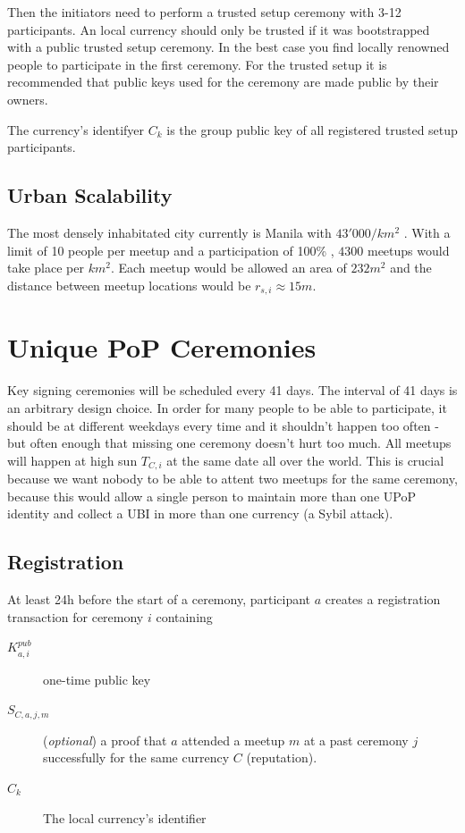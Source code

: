 \documentclass[conference]{IEEEtran}
\begin{document}
Then the initiators need to perform a trusted setup ceremony with 3-12 participants. An \encointer local currency should only be trusted if it was bootstrapped with a public trusted setup ceremony. In the best case you find locally renowned people to participate in the first ceremony. For the trusted setup it is recommended that public keys used for the ceremony are made public by their owners.

The currency's identifyer $C_k$ is the group public key of all registered trusted setup participants.

\subsection{Urban Scalability}
The most densely inhabitated city currently is Manila with $43'000/km^2$ \cite{manila18}. With a limit of 10 people per meetup and a participation of 100\% , $4300$ meetups would take place per $km^2$. Each meetup would be allowed an area of $232 m^2$ and the distance between meetup locations would be $r_{s,i} \approx 15m$. 

\section{Unique PoP Ceremonies}\label{sec:upop}
Key signing ceremonies will be scheduled every 41 days. The interval of 41 days is an arbitrary design choice. In order for many people to be able to participate, it should be at different weekdays every time and it shouldn't happen too often - but often enough that missing one ceremony doesn't hurt too much. 
All meetups will happen at high sun $T_{C,i}$ at the same date all over the world. This is crucial because we want nobody to be able to attent two meetups for the same ceremony, because this would allow a single person to maintain more than one UPoP identity and collect a UBI in more than one currency (a Sybil attack).

\subsection{Registration}\label{ceremonyprep}
At least 24h before the start of a ceremony, participant $a$ creates a registration transaction for ceremony $i$ containing
\begin{description}
\item [$K_{a,i}^{pub}$] one-time public key
\item [$S_{C,a,j,m}$] (\emph{optional}) a proof that $a$ attended a meetup $m$ at a past ceremony $j$ successfully for the same currency $C$ (reputation).
\item [$C_k$] The local currency's identifier
\end{description}
\end{document}
